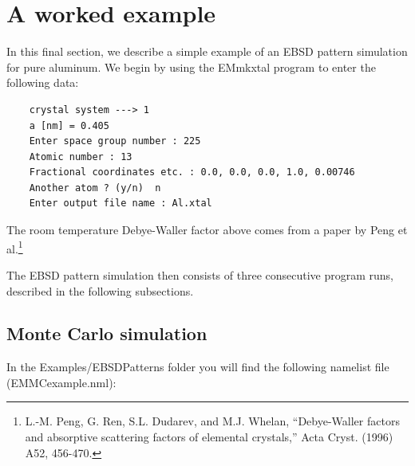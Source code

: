 \documentclass[DIV=calc, paper=letter, fontsize=11pt]{scrartcl}	 %
\begin{document}
\section{A worked example\label{sec:examples}}
In this final section, we describe a simple example of an EBSD pattern simulation for pure aluminum.  We begin by using the 
\textsf{EMmkxtal} program to enter the following data:
\begin{verbatim}
	crystal system ---> 1
	a [nm] = 0.405
	Enter space group number : 225
	Atomic number : 13
	Fractional coordinates etc. : 0.0, 0.0, 0.0, 1.0, 0.00746
	Another atom ? (y/n)  n
	Enter output file name : Al.xtal
\end{verbatim}
The room temperature Debye-Waller factor above comes from a paper by Peng et al.\footnote{L.-M. Peng, G. Ren, S.L. Dudarev, and M.J. Whelan,
``Debye-Waller factors and absorptive scattering factors of elemental crystals,'' Acta Cryst. (1996) A52, 456-470.}

The EBSD pattern simulation then consists of three consecutive program runs, described in the following subsections.

\subsection{Monte Carlo simulation}
In the \textsf{Examples/EBSDPatterns} folder you will find the following namelist file (EMMCexample.nml):
 
\end{document}
